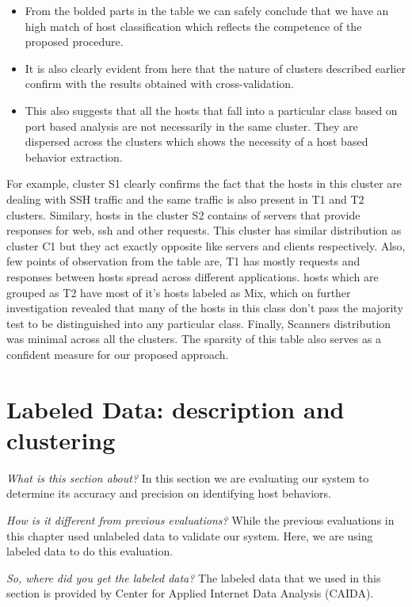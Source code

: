 \begin{itemize}
	\item From the bolded parts in the table we can safely conclude that we have an high match of host classification which reflects the competence of the proposed procedure.
	
	\item  It is also clearly evident from here that the nature of clusters described earlier confirm with the results obtained with cross-validation.
	
	\item This also suggests that all the hosts that fall into a particular class based on port based analysis are not necessarily in the same cluster. They are dispersed across the clusters which shows the necessity of a host based behavior extraction.	
\end{itemize}
  For example, cluster S1 clearly confirms the fact that the hosts in this cluster are dealing with SSH traffic and the same traffic is also present in T1 and T2 clusters. Similary, hosts in the cluster S2 contains of servers that provide responses for web, ssh and other requests. This cluster has similar distribution as cluster C1 but they act exactly opposite like servers and clients respectively. Also, few points of observation from the table are, T1 has mostly requests and responses between hosts spread across different applications. hosts which are grouped as T2 have most of it's hosts labeled as Mix, which on further investigation revealed that many of the hosts in this class don't pass the majority test to be distinguished into any particular class. Finally, Scanners distribution was minimal across all the clusters. The sparsity of this table also serves as a confident measure for our proposed approach.

\section{Labeled Data: description and clustering}

\textit{What is this section about?} In this section we are evaluating our system to determine its accuracy and precision on identifying host behaviors.

\textit{How is it different from previous evaluations?} While the previous evaluations in this chapter used unlabeled data to validate our system. Here, we are using labeled data to do this evaluation.

\textit{So, where did you get the labeled data?} The labeled data that we used in this section is provided by Center for Applied Internet Data Analysis (CAIDA).

